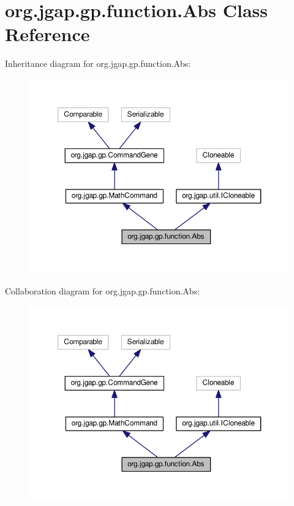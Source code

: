 \hypertarget{classorg_1_1jgap_1_1gp_1_1function_1_1_abs}{\section{org.\-jgap.\-gp.\-function.\-Abs Class Reference}
\label{classorg_1_1jgap_1_1gp_1_1function_1_1_abs}
}


Inheritance diagram for org.\-jgap.\-gp.\-function.\-Abs\-:
\nopagebreak
\begin{figure}[H]
\begin{center}
\leavevmode
\includegraphics[width=350pt]{classorg_1_1jgap_1_1gp_1_1function_1_1_abs__inherit__graph}
\end{center}
\end{figure}


Collaboration diagram for org.\-jgap.\-gp.\-function.\-Abs\-:
\nopagebreak
\begin{figure}[H]
\begin{center}
\leavevmode
\includegraphics[width=350pt]{classorg_1_1jgap_1_1gp_1_1function_1_1_abs__coll__graph}
\end{center}
\end{figure}
